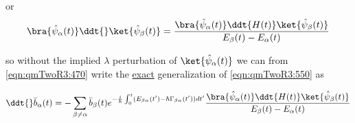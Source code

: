 or
\begin{equation}\label{eqn:qmTwoR3:650}
\bra{\hat{\psi}_\alpha(t)}
\ddt{}\ket{\hat{\psi}_\beta(t)} 
=
\frac{
\bra{\hat{\psi}_\alpha(t)}
\ddt{H(t)} \ket{\hat{\psi}_\beta(t)} 
}
{E_\beta(t) - E_\alpha(t)}
\end{equation}

so without the implied $\lambda$ perturbation of $\ket{\hat{\psi}_\alpha(t)}$ we can from \ref{eqn:qmTwoR3:470} write the \underline{exact} generalization of \ref{eqn:qmTwoR3:550} as

\begin{equation}\label{eqn:qmTwoR3:470}
\ddt{}\bar{b}_\alpha(t)
=
-\sum_{\beta \ne \alpha} \bar{b}_\beta(t)
e^{-\frac{i}{\hbar} \int_0^t (E_{\beta\alpha}(t') - \hbar \Gamma_{\beta\alpha}(t')) dt'}
\frac{
\bra{\hat{\psi}_\alpha(t)}
\ddt{H(t)} \ket{\hat{\psi}_\beta(t)} 
}
{E_\beta(t) - E_\alpha(t)}
\end{equation}

\EndArticle
